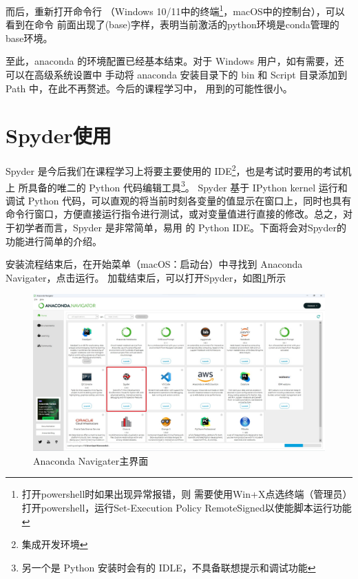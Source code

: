 而后，重新打开命令行
（Windows 10/11中的终端\footnote{打开powershell时如果出现异常报错，则
需要使用Win+X点选终端（管理员）打开powershell，运行Set-Execution
Policy RemoteSigned以使能脚本运行功能}，macOS中的控制台），可以看到在命令
前面出现了(base)字样，表明当前激活的python环境是conda管理的base环境。

至此，anaconda 的环境配置已经基本结束。对于 Windows 用户，如有需要，还可以在高级系统设置中
手动将 anaconda 安装目录下的 bin 和 Script 目录添加到 Path 中，在此不再赘述。今后的课程学习中，
用到的可能性很小。

\section{Spyder使用}
Spyder 是今后我们在课程学习上将要主要使用的 IDE\footnote{集成开发环境}，也是考试时要用的考试机上
所具备的唯二的 Python 代码编辑工具\footnote{另一个是 Python 安装时会有的 IDLE，不具备联想提示和调试功能}。
Spyder 基于 IPython kernel 运行和调试 Python 代码，可以直观的将当前时刻各变量的值显示在窗口上，同时也具有
命令行窗口，方便直接运行指令进行测试，或对变量值进行直接的修改。总之，对于初学者而言，Spyder 是非常简单，易用
的 Python IDE。下面将会对Spyder的功能进行简单的介绍。

安装流程结束后，在开始菜单（macOS：启动台）中寻找到 Anaconda Navigater，点击运行。
加载结束后，可以打开Spyder，如图\ref{fig:navigater}所示
\begin{figure}[htbp]
    \centering
    \includegraphics*[width=0.7\linewidth]{pic/anaconda_nav_Spyder.jpg}
    \caption{Anaconda Navigater主界面}
    \label{fig:navigater}
\end{figure}

